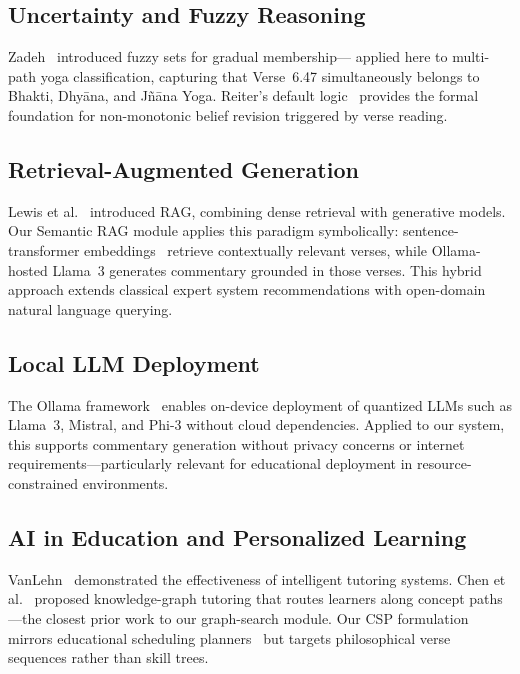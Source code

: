 \documentclass[conference]{IEEEtran}
\begin{document}
\subsection{Uncertainty and Fuzzy Reasoning}

Zadeh~\cite{zadeh1965fuzzy} introduced fuzzy sets for gradual membership—
applied here to multi-path yoga classification, capturing that Verse~6.47
simultaneously belongs to Bhakti, Dhy\={a}na, and J\~{n}\={a}na Yoga.
Reiter's default logic~\cite{reiter1980logic} provides the formal foundation
for non-monotonic belief revision triggered by verse reading.

\subsection{Retrieval-Augmented Generation}

Lewis et al.~\cite{lewis2020rag} introduced RAG, combining dense retrieval
with generative models. Our Semantic RAG module applies this paradigm
symbolically: sentence-transformer embeddings~\cite{reimers2019sentencebert}
retrieve contextually relevant verses, while Ollama-hosted Llama~3 generates
commentary grounded in those verses. This hybrid approach extends classical
expert system recommendations with open-domain natural language querying.

\subsection{Local LLM Deployment}

The Ollama framework~\cite{ollama2024} enables on-device deployment of
quantized LLMs such as Llama~3, Mistral, and Phi-3 without cloud dependencies.
Applied to our system, this supports commentary generation without privacy
concerns or internet requirements—particularly relevant for educational
deployment in resource-constrained environments.

\subsection{AI in Education and Personalized Learning}

VanLehn~\cite{vanlehn2011relative} demonstrated the effectiveness of
intelligent tutoring systems. Chen et al.~\cite{chen2018kgtutor} proposed
knowledge-graph tutoring that routes learners along concept paths—the closest
prior work to our graph-search module. Our CSP formulation mirrors educational
scheduling planners~\cite{kumar1992algorithms} but targets philosophical verse
sequences rather than skill trees.
\end{document}
